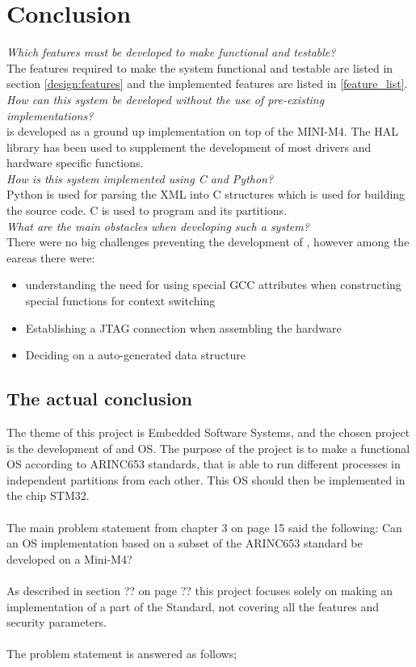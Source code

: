 \chapter{Conclusion}
\textit{Which features must be developed to make \OSname{} functional and
testable?}\\
The features required to make the system functional and testable are listed in  section \ref{design:features}
and the implemented features are listed in \ref{feature_list}.\\

\textit{How can this system be developed without the use of pre-existing
implementations?}\\
\OSname{} is developed as a ground up implementation on top of the MINI-M4.
The HAL library has been used to supplement the development of most drivers and hardware specific functions.\\

\textit{How is this system implemented using C and Python?}\\
Python is used for parsing the XML into C structures which is used for building the source code.
C is used to program \OSname{} and its partitions.\\

\textit{What are the main obstacles when developing such a system?}\\
There were no big challenges preventing the development of \OSname{},
however among the eareas  there were:
\begin{itemize}
	\item understanding the need for using special GCC attributes when constructing special functions for context switching
	\item Establishing a JTAG connection when assembling the hardware
	\item Deciding on a auto-generated data structure
\end{itemize}

\section{The actual conclusion}
The theme of this project is Embedded Software Systems, and the chosen project is the development of and
OS. The purpose of the project is to make a functional OS according to ARINC653 standards, that is able to
run different processes in independent partitions from each other. This OS should then be implemented in
the chip STM32.\\
\\
The main problem statement from chapter 3 on page 15 said the following: Can an OS implementation based on
a subset of the ARINC653 standard be developed on a Mini-M4?\\
\\
As described in section ?? on page ?? this project focuses solely on making an
implementation of a part of the Standard, not covering all the features and security parameters.\\
\\
The problem statement is answered as follows;\\

